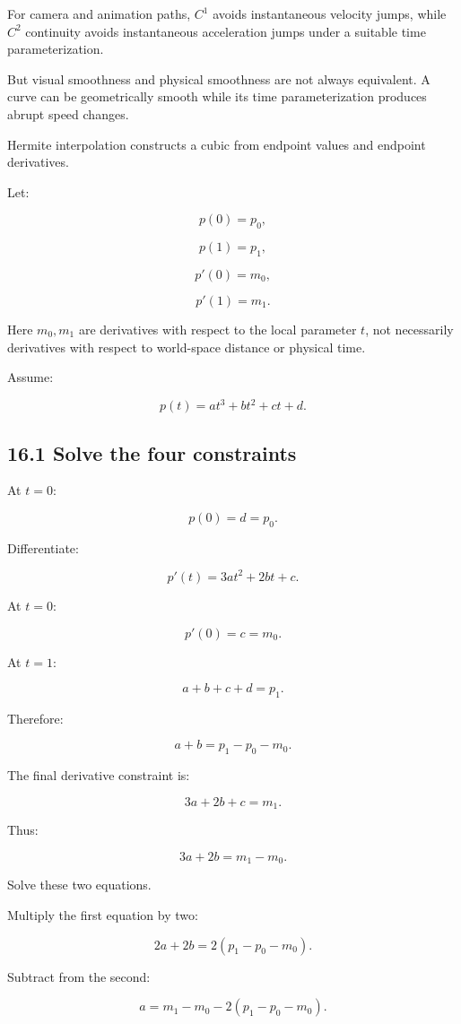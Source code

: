 For camera and animation paths, \(C^1\) avoids instantaneous velocity jumps, while \(C^2\) continuity avoids instantaneous acceleration jumps under a suitable time parameterization.

But visual smoothness and physical smoothness are not always equivalent. A curve can be geometrically smooth while its time parameterization produces abrupt speed changes.

Hermite interpolation constructs a cubic from endpoint values and endpoint derivatives.

Let:

\[ p(0)=p_0, \]

\[ p(1)=p_1, \]

\[ p'(0)=m_0, \]

\[ p'(1)=m_1. \]

Here \(m_0,m_1\) are derivatives with respect to the local parameter \(t\), not necessarily derivatives with respect to world-space distance or physical time.

Assume:

\[ p(t)=at^3+bt^2+ct+d. \]

\subsection{16.1 Solve the four constraints}\label{02-foundations-ii-ch028-solve-the-four-constraints}

At \(t=0\):

\[ p(0)=d=p_0. \]

Differentiate:

\[ p'(t)=3at^2+2bt+c. \]

At \(t=0\):

\[ p'(0)=c=m_0. \]

At \(t=1\):

\[ a+b+c+d=p_1. \]

Therefore:

\[ a+b=p_1-p_0-m_0. \]

The final derivative constraint is:

\[ 3a+2b+c=m_1. \]

Thus:

\[ 3a+2b=m_1-m_0. \]

Solve these two equations.

Multiply the first equation by two:

\[ 2a+2b=2(p_1-p_0-m_0). \]

Subtract from the second:

\[ a=m_1-m_0-2(p_1-p_0-m_0). \]

